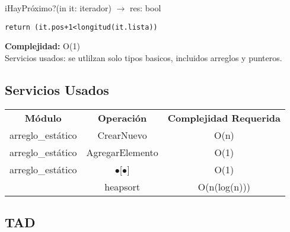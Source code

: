 iHayPr\'oximo?(in it: iterador) $\rightarrow$ res: bool
\begin{lstlisting}[mathescape]
 return (it.pos+1<longitud(it.lista))
\end{lstlisting}
\textbf{Complejidad:} O(1)\\

Servicios usados: se utlilzan solo tipos basicos, incluidos arreglos y punteros.

\subsection{Servicios Usados}
\begin{center}
\begin{tabular*}{2.75\textwidth}{c |c | c }
\textbf{M\'odulo} & \textbf{Operaci\'on} & \textbf{Complejidad Requerida}\\
arreglo\_est\'atico & CrearNuevo & O(n)\\
arreglo\_est\'atico & AgregarElemento & O(1)\\
arreglo\_est\'atico & $\bullet$[$\bullet$] & O(1)\\
& heapsort & O(n(log(n)))\\
\end{tabular*}
\end{center}


\subsection {TAD }

\begin{tad}{}



\tadObservadores
{}

\tadGeneradores
{}

\tadOtrasOperaciones
{}




\end{tad}

